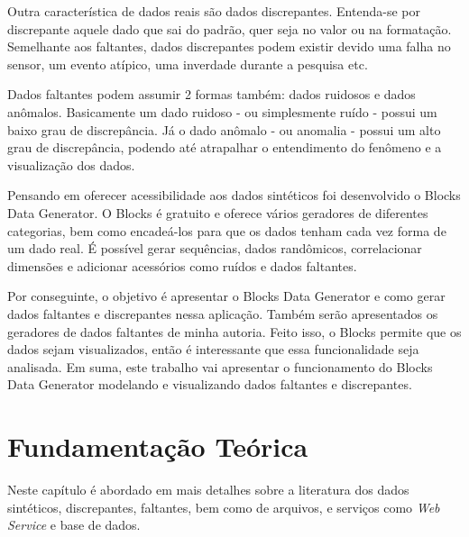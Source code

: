 \documentclass[
	12pt,				%
	openright,			%
	twoside,			%
	a4paper,			%
	english,			%
	brazil				%
	]{abntex2}
\begin{document}
\par
Outra característica de dados reais são dados discrepantes.
Entenda-se por discrepante aquele dado que sai do padrão, quer seja no valor ou na formatação.
Semelhante aos faltantes, dados discrepantes podem existir devido uma falha no sensor, um evento atípico, uma inverdade durante a pesquisa etc.
\par
Dados faltantes podem assumir 2 formas também: dados ruidosos e dados anômalos.
Basicamente um dado ruidoso - ou simplesmente ruído - possui um baixo grau de discrepância.
Já o dado anômalo - ou anomalia - possui um alto grau de discrepância, podendo até atrapalhar o entendimento do fenômeno e a visualização dos dados.
\par
Pensando em oferecer acessibilidade aos dados sintéticos foi desenvolvido o Blocks Data Generator.
O Blocks é gratuito e oferece vários geradores de diferentes categorias, bem como encadeá-los para que os dados tenham cada vez forma de um dado real.
É possível gerar sequências, dados randômicos, correlacionar dimensões e adicionar acessórios como ruídos e dados faltantes.
\par
Por conseguinte, o objetivo é apresentar o Blocks Data Generator e como gerar dados faltantes e discrepantes nessa aplicação.
Também serão apresentados os geradores de dados faltantes de minha autoria.
Feito isso, o Blocks permite que os dados sejam visualizados, então é interessante que essa funcionalidade seja analisada.
Em suma, este trabalho vai apresentar o funcionamento do Blocks Data Generator modelando e visualizando dados faltantes e discrepantes.



\chapter{Fundamentação Teórica}
	Neste capítulo é abordado em mais detalhes sobre a literatura dos dados sintéticos, discrepantes, faltantes,
	 bem como de arquivos, e serviços como \emph{Web Service} e base de dados.

\end{document}
